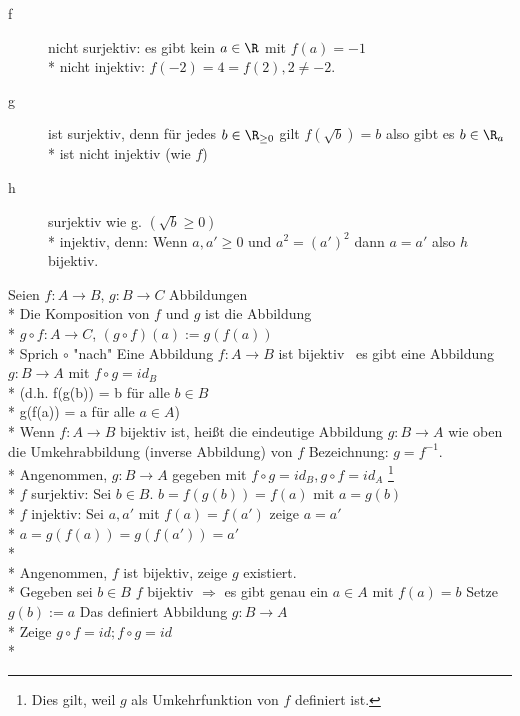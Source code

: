 \begin{description}
\item[f]{
\hspace{6mm}nicht surjektiv: es gibt kein $a\in\R$ mit $f(a)=-1$\\*
nicht injektiv: $f(-2)=4=f(2), 2\neq -2.$}
%
\item[g]{
\hspace{5mm}ist surjektiv, denn für jedes $b \in \R_{\geq 0}$ gilt $f( \sqrt{b} ) = b$ also gibt es $b \in \R_a$\\*
 ist nicht injektiv (wie $f$)}
%
\item[h]{
\hspace{5mm}surjektiv wie g. $(\sqrt{b} \geq 0)$\\*
injektiv, denn: Wenn $a, a' \geq 0$ und $a^2 = (a')^2$ dann $a = a'$ also $h$ bijektiv.}
\end{description}
%
Seien $f:A→B$, $g:B→C$ Abbildungen\\*
Die Komposition von $f$ und $g$ ist die Abbildung\\*
$g \circ  f: A→C$, $(g \circ f)(a):=g(f(a))$\\*
Sprich $\circ$ "nach"
%
%
Eine Abbildung $f: A \to B$ ist bijektiv \equ \ es gibt eine Abbildung $g: B \to A$ mit $f \circ g = id_B$\\*
(d.h. f(g(b)) = b für alle $b \in B$\\*
      g(f(a)) = a für alle $a \in A$)\\*
%
Wenn $f:A→B$ bijektiv ist, heißt die eindeutige Abbildung $g:B→A$ wie oben die Umkehrabbildung (inverse Abbildung) von $f$
Bezeichnung: $g=f^{-1}$.\\*
%
\bew
Angenommen, $g: B \to A$ gegeben mit $f \circ g = id_B, g \circ f = id_A$ \footnote{Dies gilt, weil $g$ als Umkehrfunktion von $f$ definiert ist.}\\*
$f$ surjektiv: Sei $b \in B$. $b = f(g(b)) = f(a)$ mit $a = g(b)$ \ok\\*
$f$ injektiv: Sei $a, a'$ mit $f(a) = f(a')$ zeige $a = a'$ \\*
$a = g(f(a)) = g(f(a')) = a' $\ok \\* \\*
%
Angenommen, $f$ ist bijektiv, zeige $g$ existiert.\\*
Gegeben sei $b \in B$ $f$ bijektiv $\Rightarrow$ es gibt genau ein $a \in A $ mit $f(a) = b$ 
Setze $g(b):=a$ Das definiert Abbildung $g:B→A$\\*
Zeige $g \circ f=id; f \circ g = id$\\*
